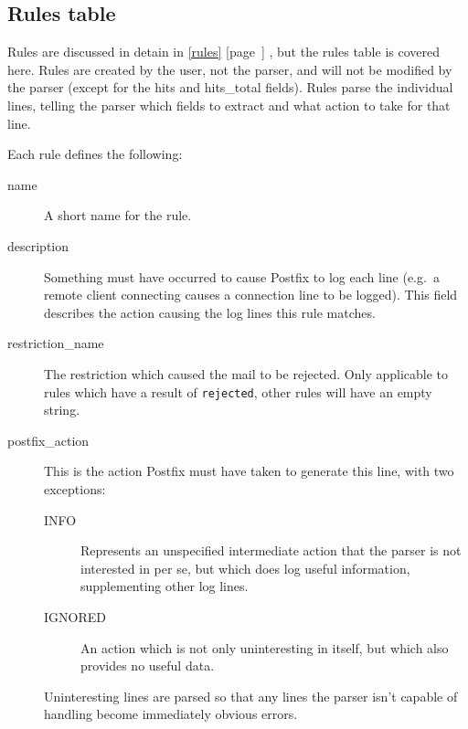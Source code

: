 \documentclass[a4paper,12pt,draft]{article}
\newcommand{\refwithpage}[1]{%
    \empty{}\ref{#1} [page~\pageref{#1}]%
}
\newcommand{\sectionref}[1]{%
    \textsection{}\refwithpage{#1}%
}
\begin{document}
\subsection{Rules table}

\label{rule attributes}

Rules are discussed in detain in \sectionref{rules}, but the rules table is
covered here.  Rules are created by the user, not the parser, and will not
be modified by the parser (except for the hits and hits\_total fields).
Rules parse the individual lines, telling the parser which fields to
extract and what action to take for that line.

Each rule defines the following:

\begin{description}

    \item [name] A short name for the rule.

    \item [description] Something must have occurred to cause Postfix to
        log each line (e.g.\ a remote client connecting causes a connection
        line to be logged).  This field describes the action causing the
        log lines this rule matches.

    \item [restriction\_name] The restriction which caused the mail to be
        rejected.  Only applicable to rules which have a result of
        \texttt{rejected}, other rules will have an empty string.

    \item [postfix\_action] This is the action Postfix must have taken to
        generate this line, with two exceptions:

        \begin{description}

            \item [INFO] Represents an unspecified intermediate action that
                the parser is not interested in per se, but which does log
                useful information, supplementing other log lines.

            \item [IGNORED] An action which is not only uninteresting in
                itself, but which also provides no useful data.

        \end{description}

        Uninteresting lines are parsed so that any lines the parser isn't
        capable of handling become immediately obvious errors.


\end{description}
\end{document}
